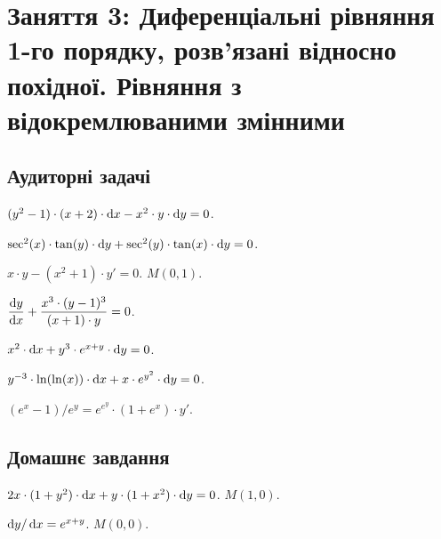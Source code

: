 \section*{Заняття 3: Диференціальні рівняння 1-го порядку, розв'язані відносно похідної. Рівняння з відокремлюваними змінними}

\subsection*{Аудиторні задачі}

\begin{problem}
	$(y^2 - 1) \cdot (x + 2) \cdot \mathop{}\!\mathrm{d} x - x^2 \cdot y \cdot \mathop{}\!\mathrm{d} y = 0$.
\end{problem}

\begin{problem}
	$\sec^2 (x) \cdot \tan (y) \cdot \mathop{}\!\mathrm{d} y + \sec^2 (y) \cdot \tan (x) \cdot \mathop{}\!\mathrm{d} y = 0$.
\end{problem}

\begin{problem}
	$x \cdot y - (x^2 + 1) \cdot y' = 0$.  $M(0,1)$.
\end{problem}

\begin{problem}
	$\dfrac{\mathop{}\!\mathrm{d} y}{\mathop{}\!\mathrm{d} x} + \dfrac{x^3 \cdot (y - 1)^3}{(x + 1) \cdot y} = 0$.
\end{problem}

\begin{problem}
	$x^2 \cdot \mathop{}\!\mathrm{d} x + y^3 \cdot e^{x + y} \cdot \mathop{}\!\mathrm{d} y = 0$.
\end{problem}

\begin{problem}
	$y^{-3} \cdot \ln (\ln (x)) \cdot \mathop{}\!\mathrm{d} x + x \cdot e^{y^2} \cdot \mathop{}\!\mathrm{d} y = 0$.
\end{problem}

\begin{problem}
	$(e^x - 1) / e^y = e^{e^y} \cdot (1 + e^x) \cdot y'$.
\end{problem}

\subsection*{Домашнє завдання}

\begin{problem}
	$2 x \cdot (1 + y^2) \cdot \mathop{}\!\mathrm{d} x + y \cdot (1 + x^2) \cdot \mathop{}\!\mathrm{d} y = 0$.  $M(1,0)$.
\end{problem}

\begin{problem}
	$\mathop{}\!\mathrm{d} y / \mathop{}\!\mathrm{d} x = e^{x + y}$.  $M(0,0)$.
\end{problem}

